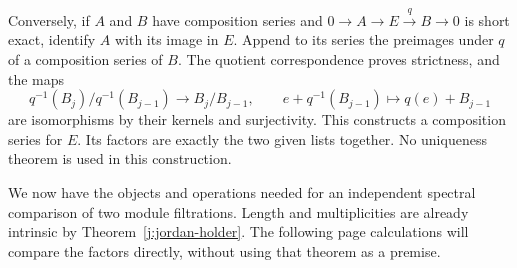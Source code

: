 Conversely, if $A$ and $B$ have composition series and
$0\to A\to E\xrightarrow{q}B\to0$ is short exact, identify $A$
with its image in $E$. Append to its series the preimages under $q$
of a composition series of $B$. The quotient correspondence proves
strictness, and the maps
\[
 q^{-1}(B_j)/q^{-1}(B_{j-1})\longrightarrow B_j/B_{j-1},\qquad
 e+q^{-1}(B_{j-1})\longmapsto q(e)+B_{j-1}
\]
are isomorphisms by their kernels and surjectivity. This constructs
a composition series for $E$. Its factors are exactly the two given
lists together. No uniqueness theorem is used in this construction.

We now have the objects and operations needed for an independent
spectral comparison of two module filtrations. Length and multiplicities
are already intrinsic by Theorem~\ref{j:jordan-holder}. The following
page calculations will compare the factors directly, without using that
theorem as a premise.

